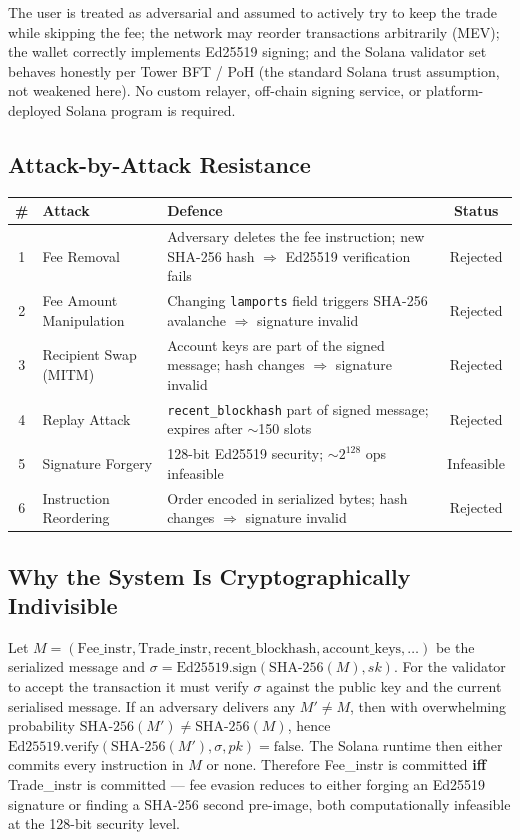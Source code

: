 \documentclass[11pt,a4paper]{article}
\begin{document}
The user is treated as adversarial and assumed to actively try to keep the trade while skipping the fee; the network may reorder transactions arbitrarily (MEV); the wallet correctly implements Ed25519 signing; and the Solana validator set behaves honestly per Tower BFT / PoH (the standard Solana trust assumption, not weakened here). No custom relayer, off-chain signing service, or platform-deployed Solana program is required.

\subsection{Attack-by-Attack Resistance}

\begin{center}
\begin{tabular}{c p{} p{} c}
\toprule
\textbf{\#} & \textbf{Attack} & \textbf{Defence} & \textbf{Status} \\
\midrule
1 & Fee Removal & Adversary deletes the fee instruction; new SHA-256 hash $\Rightarrow$ Ed25519 verification fails & Rejected \\
2 & Fee Amount Manipulation & Changing \texttt{lamports} field triggers SHA-256 avalanche $\Rightarrow$ signature invalid & Rejected \\
3 & Recipient Swap (MITM) & Account keys are part of the signed message; hash changes $\Rightarrow$ signature invalid & Rejected \\
4 & Replay Attack & \texttt{recent\_blockhash} part of signed message; expires after $\sim$150 slots & Rejected \\
5 & Signature Forgery & 128-bit Ed25519 security; $\sim 2^{128}$ ops infeasible & Infeasible \\
6 & Instruction Reordering & Order encoded in serialized bytes; hash changes $\Rightarrow$ signature invalid & Rejected \\
\bottomrule
\end{tabular}
\end{center}

\subsection{Why the System Is Cryptographically Indivisible}

Let $M = (\text{Fee\_instr}, \text{Trade\_instr}, \text{recent\_blockhash}, \text{account\_keys}, \ldots)$ be the serialized message and $\sigma = \text{Ed25519.sign}(\text{SHA-256}(M), sk)$. For the validator to accept the transaction it must verify $\sigma$ against the public key and the current serialised message. If an adversary delivers any $M' \ne M$, then with overwhelming probability $\text{SHA-256}(M') \ne \text{SHA-256}(M)$, hence $\text{Ed25519.verify}(\text{SHA-256}(M'), \sigma, pk) = \text{false}$. The Solana runtime then either commits every instruction in $M$ or none. Therefore Fee\_instr is committed \textbf{iff} Trade\_instr is committed --- fee evasion reduces to either forging an Ed25519 signature or finding a SHA-256 second pre-image, both computationally infeasible at the 128-bit security level.
\end{document}
